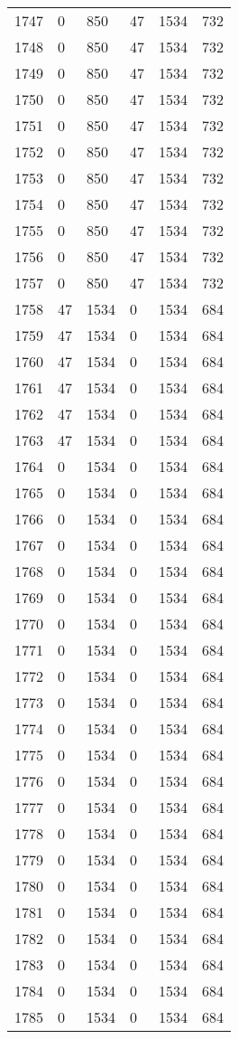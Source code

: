 \documentclass[a4paper]{ctexart}
\begin{document}
\begin{longtable}{p{1cm}|p{2cm}|p{2cm}|p{2cm}|P{2cm}|p{2cm}}
		1747&0&850&47&1534&732\\
		1748&0&850&47&1534&732\\
		1749&0&850&47&1534&732\\
		1750&0&850&47&1534&732\\
		1751&0&850&47&1534&732\\
		1752&0&850&47&1534&732\\
		1753&0&850&47&1534&732\\
		1754&0&850&47&1534&732\\
		1755&0&850&47&1534&732\\
		1756&0&850&47&1534&732\\
		1757&0&850&47&1534&732\\
		1758&47&1534&0&1534&684\\
		1759&47&1534&0&1534&684\\
		1760&47&1534&0&1534&684\\
		1761&47&1534&0&1534&684\\
		1762&47&1534&0&1534&684\\
		1763&47&1534&0&1534&684\\
		1764&0&1534&0&1534&684\\
		1765&0&1534&0&1534&684\\
		1766&0&1534&0&1534&684\\
		1767&0&1534&0&1534&684\\
		1768&0&1534&0&1534&684\\
		1769&0&1534&0&1534&684\\
		1770&0&1534&0&1534&684\\
		1771&0&1534&0&1534&684\\
		1772&0&1534&0&1534&684\\
		1773&0&1534&0&1534&684\\
		1774&0&1534&0&1534&684\\
		1775&0&1534&0&1534&684\\
		1776&0&1534&0&1534&684\\
		1777&0&1534&0&1534&684\\
		1778&0&1534&0&1534&684\\
		1779&0&1534&0&1534&684\\
		1780&0&1534&0&1534&684\\
		1781&0&1534&0&1534&684\\
		1782&0&1534&0&1534&684\\
		1783&0&1534&0&1534&684\\
		1784&0&1534&0&1534&684\\
		1785&0&1534&0&1534&684\\

\end{longtable}
\end{document}
